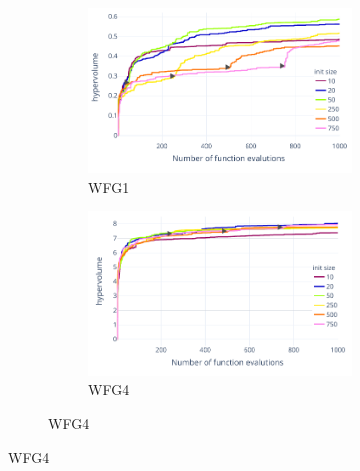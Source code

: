         \begin{figure}[!h]
            \centering
            \begin{subfigure}{\textwidth}
                \begin{subfigure}{0.45\textwidth}
                    \includegraphics[width=\textwidth]{content/images/hypermapper_wfg1_start_set}
                    \caption{WFG1}
                    \label{fig:hmapper_wfg1_start_set}
                \end{subfigure}
                \begin{subfigure}{0.45\textwidth}
                    \includegraphics[width=\textwidth]{content/images/hypermapper_wfg4_start_set}
                    \caption{WFG4}
                    \label{fig:hmapper_wfg4_start_set}
                \end{subfigure}
            \end{subfigure} 
            \hfill


\end{figure}
